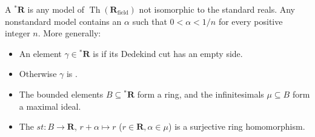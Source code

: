 A  $^*\mathbf{R}$ is any model of $\operatorname{Th}(\mathbf{R}_{\text{field}})$ not isomorphic to the standard reals. Any nonstandard model contains an  $\alpha$ such that $0 < \alpha < 1/n$ for every positive integer $n$. More generally:
\begin{itemize}
\item An element $\gamma \in {}^*\mathbf{R}$ is  if its Dedekind cut has an empty side.
\item Otherwise $\gamma$ is .
\item The bounded elements $B \subseteq {}^*\mathbf{R}$ form a ring, and the infinitesimals $\mu \subseteq B$ form a maximal ideal.
\item The  $st: B \to \mathbf{R}$, $r + \alpha \mapsto r$ ($r \in \mathbf{R}, \alpha \in \mu$) is a surjective ring homomorphism.
\end{itemize}
